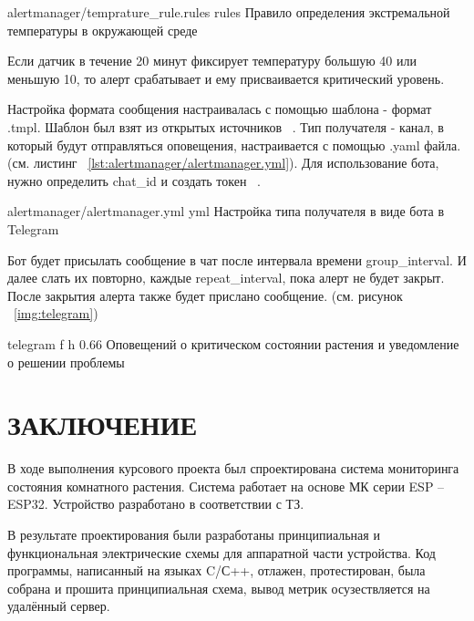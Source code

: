 \documentclass{bmstu}
\begin{document}
        {alertmanager/temprature_rule.rules}
        {rules}
        {Правило определения экстремальной температуры в окружающей среде}

    Если датчик в течение 20 минут фиксирует температуру большую 40 или меньшую 10, то алерт срабатывает
    и ему присваивается критический уровень.

    Настройка формата сообщения настраивалась с помощью шаблона - формат .tmpl.
    Шаблон был взят из открытых источников ~\cite{TelegramMessageTemplate}.
    Тип получателя - канал, в который будут отправляться оповещения, настраивается с помощью .yaml файла.
    (см. листинг ~\ref{lst:alertmanager/alertmanager.yml}).
    Для использование бота, нужно определить chat\_id и создать токен ~\cite{262588213843476HowGetTelegram}.

        {alertmanager/alertmanager.yml} %
        {yml}
        {Настройка типа получателя в виде бота в Telegram} %

    Бот будет присылать сообщение в чат после интервала времени group\_interval.
    И далее слать их повторно, каждые repeat\_interval, пока алерт не будет закрыт.
    После закрытия алерта также будет прислано сообщение. (см. рисунок ~\ref{img:telegram})

        {telegram}
        {f}
        {h}
        {0.66\textwidth}
        {Оповещений о критическом состоянии растения и уведомление о решении проблемы}


    \chapter*{ЗАКЛЮЧЕНИЕ}

    В ходе выполнения курсового проекта был спроектирована система мониторинга состояния комнатного растения.
    Система работает на основе МК серии ESP – ESP32.
    Устройство разработано в соответствии с ТЗ.

    В результате проектирования были разработаны принципиальная и функциональная электрические схемы для аппаратной части устройства. Код программы, написанный на языках C/С++, отлажен, протестирован, была собрана и прошита принципиальная схема, вывод метрик осузествляется на удалённый сервер.

    \makebibliography
\end{document}
